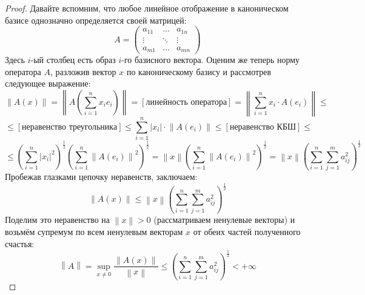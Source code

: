 \documentclass[11pt]{article}
\begin{document}
\begin{proof}
    Давайте вспомним, что любое линейное отображение в каноническом базисе однозначно определяется своей матрицей:
    \begin{equation*}
        A = 
        \begin{pmatrix}
            a_{11} & \ldots & a_{1n} \\
            \vdots & \ddots & \vdots \\
            a_{m1} & \ldots & a_{mn}
        \end{pmatrix}
    \end{equation*}
    Здесь $i$-ый столбец есть образ $i$-го базисного вектора. Оценим же теперь норму оператора $A$,
    разложив вектор $x$ по каноническому базису и рассмотрев следующее выражение:
    \begin{equation*}
        \left\lVert A(x) \right\rVert = \left\lVert A \left(\sum_{i = 1}^n x_i e_i \right)\right\rVert = \left[\text{линейность оператора}\right] = \left\lVert \sum_{i = 1}^n x_i \cdot A(e_i) \right\rVert
        \leq
    \end{equation*}
    \begin{equation*}
        \leq \left[\text{неравенство треугольника}\right] \leq \sum_{i = 1}^n \left\lvert x_i \right\rvert \cdot \left\lVert A(e_i) \right\rVert \leq [\text{неравенство КБШ}] \leq  
    \end{equation*}
    \begin{equation*}
        \leq \left(\sum_{i = 1}^n \left\lvert x_i \right\rvert^2 \right)^{\frac{1}{2}} \left(\sum_{i = 1}^n \left\lVert A(e_i) \right\rVert^2 \right)^{\frac{1}{2}} = \left\lVert x \right\rVert  \left(\sum_{i = 1}^n \left\lVert A(e_i) \right\rVert^2 \right)^{\frac{1}{2}} = \left\lVert x \right\rVert \left(\sum_{i = 1}^n \sum_{j = 1}^m a_{ij}^2\right)^{\frac{1}{2}}
    \end{equation*}
    Пробежав глазками цепочку неравенств, заключаем:
    \[\left\lVert A(x) \right\rVert \leq  \left\lVert x \right\rVert \left(\sum_{i = 1}^n \sum_{j = 1}^m a_{ij}^2\right)^{\frac{1}{2}}\]
    Поделим это неравенство на $\left\lVert x \right\rVert > 0$ (рассматриваем ненулевые векторы) и возьмём супремум по всем ненулевым векторам $x$ от обеих частей полученного счастья:
    \[\left\lVert A \right\rVert = \sup_{x \neq 0} \frac{\left\lVert A(x) \right\rVert}{\left\lVert x \right\rVert} \leq \left(\sum_{i = 1}^n \sum_{j = 1}^m a_{ij}^2\right)^{\frac{1}{2}} < +\infty \]
\end{proof}
\end{document}
